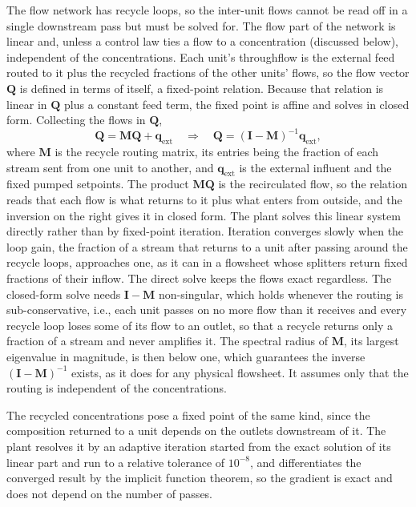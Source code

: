 \documentclass{article}
\begin{document}
The flow network has recycle loops, so the inter-unit flows cannot be read off in a single downstream pass but must be solved for. The flow part of the network is linear and, unless a control law ties a flow to a concentration (discussed below), independent of the concentrations. Each unit's throughflow is the external feed routed to it plus the recycled fractions of the other units' flows, so the flow vector \(\mathbf{Q}\) is defined in terms of itself, a fixed-point relation. Because that relation is linear in \(\mathbf{Q}\) plus a constant feed term, the fixed point is affine and solves in closed form. Collecting the flows in \(\mathbf{Q}\),
\begin{equation}
  \mathbf{Q} = \mathbf{M}\mathbf{Q} + \mathbf{q}_{\mathrm{ext}}
  \quad\Longrightarrow\quad
  \mathbf{Q} = (\mathbf{I}-\mathbf{M})^{-1}\mathbf{q}_{\mathrm{ext}},
  \label{eq:flow-fixedpoint}
\end{equation}
where \(\mathbf{M}\) is the recycle routing matrix, its entries being the fraction of each stream sent from one unit to another, and \(\mathbf{q}_{\mathrm{ext}}\) is the external influent and the fixed pumped setpoints. The product \(\mathbf{M}\mathbf{Q}\) is the recirculated flow, so the relation reads that each flow is what returns to it plus what enters from outside, and the inversion on the right gives it in closed form. The plant solves this linear system directly rather than by fixed-point iteration. Iteration converges slowly when the loop gain, the fraction of a stream that returns to a unit after passing around the recycle loops, approaches one, as it can in a flowsheet whose splitters return fixed fractions of their inflow. The direct solve keeps the flows exact regardless. The closed-form solve needs \(\mathbf{I}-\mathbf{M}\) non-singular, which holds whenever the routing is sub-conservative, i.e., each unit passes on no more flow than it receives and every recycle loop loses some of its flow to an outlet, so that a recycle returns only a fraction of a stream and never amplifies it. The spectral radius of \(\mathbf{M}\), its largest eigenvalue in magnitude, is then below one, which guarantees the inverse \((\mathbf{I}-\mathbf{M})^{-1}\) exists, as it does for any physical flowsheet. It assumes only that the routing is independent of the concentrations. 

The recycled concentrations pose a fixed point of the same kind, since the composition returned to a unit depends on the outlets downstream of it. The plant resolves it by an adaptive iteration started from the exact solution of its linear part and run to a relative tolerance of \(10^{-8}\), and differentiates the converged result by the implicit function theorem, so the gradient is exact and does not depend on the number of passes. 
\end{document}
